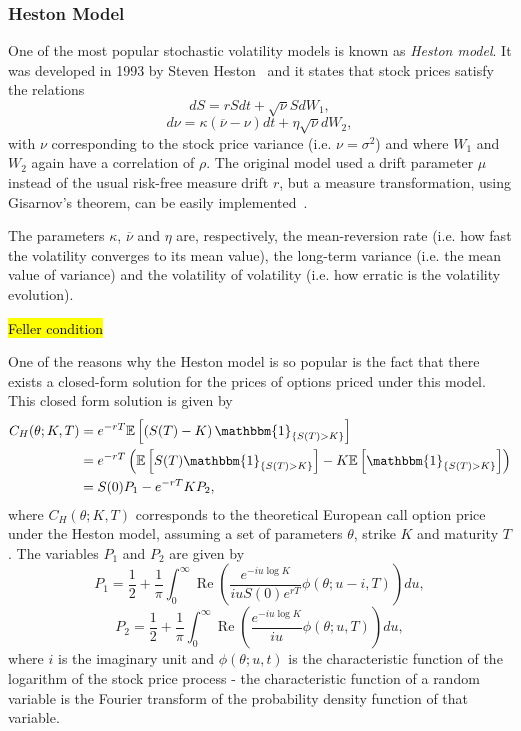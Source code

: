 \subsubsection{Heston Model}
One of the most popular stochastic volatility models is known as \emph{Heston model}. It was developed in 1993 by Steven Heston~\cite{Heston} and it states that stock prices satisfy the relations
\begin{equation}
dS=rSdt+\sqrt{\nu}SdW_1,
\end{equation}
\begin{equation}
d\nu=\kappa(\overline{\nu}-\nu)dt+\eta\sqrt{\nu}dW_2,
\end{equation}
\noindent with $\nu$ corresponding to the stock price variance (i.e. $\nu=\sigma^2$) and where $W_1$ and $W_2$ again have a correlation of $\rho$. The original model used a drift parameter $\mu$ instead of the usual risk-free measure drift $r$, but a measure transformation, using Gisarnov's theorem, can be easily implemented~\cite{Crisostomo}.

The parameters $\kappa$, $\overline{\nu}$ and $\eta$ are, respectively, the mean-reversion rate (i.e. how fast the volatility converges to its mean value), the long-term variance (i.e. the mean value of variance) and the volatility of volatility (i.e. how erratic is the volatility evolution).

\hl{Feller condition}

One of the reasons why the Heston model is so popular is the fact that there exists a closed-form solution for the prices of options priced under this model. This closed form solution is given by
\begin{equation}\label{CH}
\begin{split}
C_{H}(\theta;K,T)&=e^{-rT}\mathbb{E}\left[\left(S(T)-K\right)\mathbbm{1}_{\left\{S(T)>K\right\}}\right]\\
&=e^{-rT}\left(\mathbb{E}\left[S(T)\mathbbm{1}_{\left\{S(T)>K\right\}}\right]-K\mathbb{E}\left[\mathbbm{1}_{\left\{S(T)>K\right\}}\right]\right)\\
&=S(0)P_1-e^{-rT}KP_2,
\end{split}
\end{equation}
\noindent where $C_{H}(\theta;K,T)$ corresponds to the theoretical European call option price under the Heston model, assuming a set of parameters $\theta$, strike $K$ and maturity $T$. The variables $P_1$ and $P_2$ are given by
\begin{equation}\label{P1}
P_1=\frac{1}{2}+\frac{1}{\pi}\int_0^\infty\operatorname{Re}\left(\frac{e^{-iu\log K}}{iuS(0)e^{rT}}\phi(\theta;u-i,T)\right)du,
\end{equation}
\begin{equation}\label{P2}
P_2=\frac{1}{2}+\frac{1}{\pi}\int_0^\infty\operatorname{Re}\left(\frac{e^{-iu\log K}}{iu}\phi(\theta;u,T)\right)du,
\end{equation}
\noindent where $i$ is the imaginary unit and $\phi(\theta;u,t)$ is the characteristic function of the logarithm of the stock price process - the characteristic function of a random variable is the Fourier transform of the probability density function of that variable.

